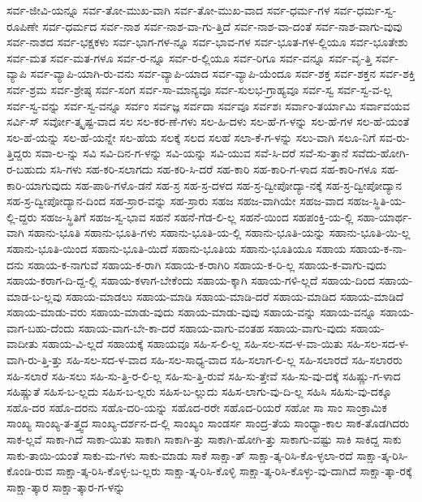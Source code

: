{ಸರ್ವ-ಜೀವಿ-ಯನ್ನೂ
ಸರ್ವ-ತೋ-ಮುಖ-ವಾಗಿ
ಸರ್ವ-ತೋ-ಮುಖ-ವಾದ
ಸರ್ವ-ಧರ್ಮ-ಗಳ
ಸರ್ವ-ಧರ್ಮ-ಸ್ವ-ರೂಪಿಣೇ
ಸರ್ವ-ಧರ್ಮದ
ಸರ್ವ-ನಾಶ
ಸರ್ವ-ನಾಶ-ವಾ-ಗು-ತ್ತಿದೆ
ಸರ್ವ-ನಾಶ-ವಾ-ದಂತೆ
ಸರ್ವ-ನಾಶ-ವಾಗು-ವುವು
ಸರ್ವ-ನಾಶದ
ಸರ್ವ-ಭಕ್ಷಕಳು
ಸರ್ವ-ಭಾಗ-ಗಳ-ನ್ನೂ
ಸರ್ವ-ಭಾವ-ಗಳ
ಸರ್ವ-ಭೂತ-ಗಳ-ಲ್ಲಿಯೂ
ಸರ್ವ-ಭೂತೇಶು
ಸರ್ವ-ಮತ
ಸರ್ವ-ಮತ-ಗಳೂ
ಸರ್ವ-ರ-ನ್ನೂ
ಸರ್ವ-ರ-ಲ್ಲಿಯೂ
ಸರ್ವ-ರಿಗೂ
ಸರ್ವ-ವನ್ನೂ
ಸರ್ವ-ವೃ-ತ್ತಿ
ಸರ್ವ-ವ್ಯಾಪಿ
ಸರ್ವ-ವ್ಯಾಪಿ-ಯಾಗಿ-ರು-ವನು
ಸರ್ವ-ವ್ಯಾಪಿ-ಯಾದ
ಸರ್ವ-ವ್ಯಾಪಿ-ಯೆಂದೂ
ಸರ್ವ-ಶಕ್ತ
ಸರ್ವ-ಶಕ್ತನ
ಸರ್ವ-ಶಕ್ತಿ
ಸರ್ವ-ಶ್ರಮ
ಸರ್ವ-ಶ್ರೇಷ್ಠ
ಸರ್ವ-ಸಂಗ
ಸರ್ವ-ಸಾ-ಮಾನ್ಯವೂ
ಸರ್ವ-ಸುಲಭ-ಗ್ರಾಹ್ಯವೂ
ಸರ್ವ-ಸ್ವ
ಸರ್ವ-ಸ್ವ-ವ-ಲ್ಲ
ಸರ್ವ-ಸ್ವ-ವನ್ನು
ಸರ್ವ-ಸ್ವ-ವನ್ನೂ
ಸರ್ವಂ
ಸರ್ವಜ್ಞ
ಸರ್ವದಾ
ಸರ್ವವೂ
ಸರ್ವಶಃ
ಸರ್ವಾಂ-ತರ್ಯಾಮಿ
ಸರ್ವಾವಯವ
ಸರ್ವಿ-ಸ್
ಸರ್ವೋ-ತ್ಕೃಷ್ಟ-ವಾದ
ಸಲ
ಸಲ-ಕರ-ಣೆ-ಗಳು
ಸಲ-ಹಿ-ದಳು
ಸಲ-ಹೆ-ಗ-ಳನ್ನು
ಸಲ-ಹೆ-ಗಳ
ಸಲ-ಹೆ-ಯಂತೆ
ಸಲ-ಹೆ-ಯನ್ನು
ಸಲ-ಹೆ-ಯನ್ನೇ
ಸಲ-ಹೆಯ
ಸಲಕ್ಕೆ
ಸಲದ
ಸಲಹೆ
ಸಲಾ-ಕೆ-ಗ-ಳನ್ನು
ಸಲು-ವಾಗಿ
ಸಲೂ-ನಿಗೆ
ಸವ-ರು-ತ್ತಿದ್ದರು
ಸವಾ-ಲ-ನ್ನು
ಸವಿ
ಸವಿ-ದಿನ-ಗ-ಳನ್ನು
ಸವಿ-ಯನ್ನು
ಸವಿ-ಯುವ
ಸವೆ-ಸಿ-ದರೆ
ಸವೆ-ಸು-ತ್ತಾನೆ
ಸವೆದು-ಹೋಗಿ-ರ-ಬಹುದು
ಸಸಿ-ಗಳು
ಸಹ-ಕರಿ-ಸಲಾಗದು
ಸಹ-ಕರಿ-ಸಿ-ದರೆ
ಸಹ-ಕಾರಿ
ಸಹ-ಕಾರಿ-ಗ-ಳಾದ
ಸಹ-ಕಾರಿ-ಗಳೂ
ಸಹ-ಕಾರಿ-ಯಾಗುವುದು
ಸಹ-ಪಾಠಿ-ಗಳೊ-ಡನೆ
ಸಹ-ಸ್ರ
ಸಹ-ಸ್ರ-ದಳದ
ಸಹ-ಸ್ರ-ದ್ವೀಪೋದ್ಯಾ-ನಕ್ಕೆ
ಸಹ-ಸ್ರ-ದ್ವೀಪೋದ್ಯಾನ
ಸಹ-ಸ್ರ-ದ್ವೀಪೋದ್ಯಾನ-ದಿಂದ
ಸಹ-ಸ್ರಾರ-ವನ್ನು
ಸಹ-ಸ್ರಾರು
ಸಹಜ
ಸಹಜ-ವಾಗಿಯೇ
ಸಹಜ-ವಾದ
ಸಹಜ-ಸ್ಥಿತಿ-ಯ-ಲ್ಲಿ-ದ್ದರು
ಸಹಜ-ಸ್ಥಿತಿಗೆ
ಸಹಜ-ಸ್ವ-ಭಾವ
ಸಹನೆ
ಸಹನೆ-ಗೆಡ-ಲಿ-ಲ್ಲ
ಸಹನೆ-ಯಿಂದ
ಸಹಪಂಕ್ತಿ-ಯ-ಲ್ಲಿ
ಸಹಾ-ಯಾರ್ಥ-ವಾಗಿ
ಸಹಾನು-ಭೂತಿ
ಸಹಾನು-ಭೂತಿ-ಗಳು
ಸಹಾನು-ಭೂತಿ-ಯ-ಲ್ಲಿ
ಸಹಾನು-ಭೂತಿ-ಯನ್ನು
ಸಹಾನು-ಭೂತಿ-ಯಿ-ಲ್ಲ
ಸಹಾನು-ಭೂತಿ-ಯಿಂದ
ಸಹಾನು-ಭೂತಿ-ಯಿದೆ
ಸಹಾನು-ಭೂತಿಯ
ಸಹಾನು-ಭೂತಿಯೂ
ಸಹಾಯ
ಸಹಾಯ-ಕ-ನಾ-ದನು
ಸಹಾಯ-ಕ-ನಾಗುವೆ
ಸಹಾಯ-ಕ-ರಾಗಿ
ಸಹಾಯ-ಕ-ರಾಗಿರಿ
ಸಹಾಯ-ಕ-ರಿ-ಲ್ಲ
ಸಹಾಯ-ಕ-ವಾಗು-ವುದು
ಸಹಾಯ-ಕರಾಗ-ದಿ-ದ್ದ-ಲ್ಲಿ
ಸಹಾಯ-ಕಳಾಗ-ಬೇಕೆಂದು
ಸಹಾಯ-ಕ್ಕಾಗಿ
ಸಹಾಯ-ಗಳಿ-ಲ್ಲದೆ
ಸಹಾಯ-ದಿಂದ
ಸಹಾಯ-ಮಾಡ-ಬ-ಲ್ಲವು
ಸಹಾಯ-ಮಾಡಲು
ಸಹಾಯ-ಮಾಡಿ
ಸಹಾಯ-ಮಾಡಿ-ದರೆ
ಸಹಾಯ-ಮಾಡಿದ
ಸಹಾಯ-ಮಾಡಿದೆ
ಸಹಾಯ-ಮಾಡು-ವರು
ಸಹಾಯ-ಮಾಡು-ವುದು
ಸಹಾಯ-ಮಾಡು-ವುವು
ಸಹಾಯ-ವನ್ನು
ಸಹಾಯ-ವನ್ನೂ
ಸಹಾಯ-ವಾಗ-ಬಹು-ದೆಂದು
ಸಹಾಯ-ವಾಗ-ಬೇ-ಕಾ-ದರೆ
ಸಹಾಯ-ವಾಗು-ವಂತಹ
ಸಹಾಯ-ವಾಗು-ವುದು
ಸಹಾಯ-ವಾದೀತು
ಸಹಾಯ-ವಿ-ಲ್ಲದೆ
ಸಹಾಯಕ್ಕೆ
ಸಹಾಯವೂ
ಸಹಿ-ಸ-ಲಿ-ಲ್ಲ
ಸಹಿ-ಸಲ-ಸದ-ಳ-ವಾ-ಯಿತು
ಸಹಿ-ಸಲ-ಸದ-ಳ-ವಾಗಿ-ರು-ತ್ತಿ-ತ್ತು
ಸಹಿ-ಸಲ-ಸದ-ಳ-ವಾದ
ಸಹಿ-ಸಲ-ಸಾಧ್ಯ-ವಾದ
ಸಹಿ-ಸಲಾಗ-ಲಿ-ಲ್ಲ
ಸಹಿ-ಸಲಾರದೆ
ಸಹಿ-ಸಲಾರರು
ಸಹಿ-ಸಲಾರೆ
ಸಹಿ-ಸಲು
ಸಹಿ-ಸು-ತ್ತಿ-ರ-ಲಿ-ಲ್ಲ
ಸಹಿ-ಸು-ತ್ತಿ-ರುವೆ
ಸಹಿ-ಸು-ತ್ತೇವೆ
ಸಹಿ-ಸು-ವು-ದಕ್ಕೆ
ಸಹಿಷ್ಣು-ಗ-ಳಾದ
ಸಹಿಷ್ಣುತೆ
ಸಹಿಸ-ಬ-ಲ್ಲದು
ಸಹಿಸ-ಬ-ಲ್ಲರು
ಸಹಿಸ-ಬ-ಲ್ಲುದು
ಸಹಿಸ-ಲಾಗು-ವು-ದಿ-ಲ್ಲ
ಸಹಿಸಿ
ಸಹಿಸು-ವು-ದಕ್ಕೂ
ಸಹೊ-ದರ
ಸಹೊ-ದರನು
ಸಹೊ-ದರಿ-ಯನ್ನು
ಸಹೊದ-ರರೇ
ಸಹೊದ-ರಿಯರೆ
ಸಹೋ
ಸಾ
ಸಾಂ
ಸಾಂಕ್ರಾಮಿಕ
ಸಾಂಖ್ಯ
ಸಾಂಖ್ಯ-ತ-ತ್ತ್ವದ
ಸಾಂಖ್ಯ-ದರ್ಶನ-ದ-ಲ್ಲಿ
ಸಾಂಖ್ಯಂ
ಸಾಂಡರ್ಸ
ಸಾಂದ್ರ-ತೆಯ
ಸಾಂಧ್ಯಾ-ಕಾಲ
ಸಾಕ-ತೊಡಗಿದರು
ಸಾಕ-ಲ್ಲವೆ
ಸಾಕಾ-ಗಿದೆ
ಸಾಕಾ-ಯಿತು
ಸಾಕಾಗಿ
ಸಾಕಾಗಿ-ತ್ತು
ಸಾಕಾಗಿ-ಹೋಗಿ-ತ್ತು
ಸಾಕಾಗು-ವಷ್ಟು
ಸಾಕಿ
ಸಾಕಿದ್ದ
ಸಾಕು
ಸಾಕು-ತಾಯಿ-ಯಂತೆ
ಸಾಕು-ಮ-ಗಳು
ಸಾಕು-ಮಾಡು
ಸಾಕೆ
ಸಾಕ್ಷಾ-ತ್
ಸಾಕ್ಷಾ-ತ್ಕ-ರಿಸಿ-ಕೊ-ಳ್ಳಲಾ-ರದೆ
ಸಾಕ್ಷಾ-ತ್ಕ-ರಿಸಿ-ಕೊಂಡಿ-ರುವ
ಸಾಕ್ಷಾ-ತ್ಕ-ರಿಸಿ-ಕೊಳ್ಳ-ಬ-ಲ್ಲರು
ಸಾಕ್ಷಾ-ತ್ಕ-ರಿಸಿ-ಕೊಳ್ಳಿ
ಸಾಕ್ಷಾ-ತ್ಕ-ರಿಸಿ-ಕೊಳ್ಳು-ವು-ದಾಗಿದೆ
ಸಾಕ್ಷಾ-ತ್ಕಾ-ರಕ್ಕೆ
ಸಾಕ್ಷಾ-ತ್ಕಾರ
ಸಾಕ್ಷಾ-ತ್ಕಾರ-ಗ-ಳನ್ನು
}
